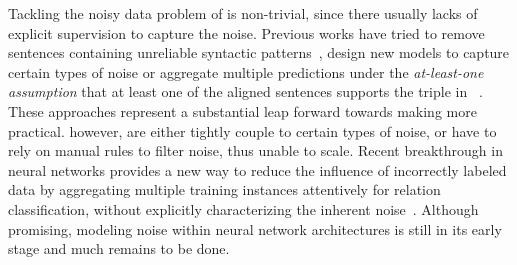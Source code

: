 Tackling the noisy data problem of \DS is non-trivial, since there usually lacks of explicit supervision to capture the noise.
Previous works have tried to remove sentences containing unreliable syntactic patterns~\cite{takamatsu2012reducing}, 
design new models to capture certain types of noise or aggregate multiple predictions under the
\textit{at-least-one assumption}
that at least one of the aligned sentences supports the triple in \KB~\cite{riedel2010modeling,surdeanu2012multi,ritter2013modeling,min2013distant}.
These approaches represent a substantial leap forward towards making \DS more practical. however,  are either tightly couple to certain types of noise,
or have to rely on manual rules to filter noise, thus unable to scale.
%
Recent breakthrough in neural networks provides a new way to reduce the influence of incorrectly labeled data by aggregating multiple training instances attentively for relation classification, without explicitly characterizing the inherent noise~\cite{lin2016neural,zeng2015distant}.
Although promising, %
 modeling noise within neural network architectures is still in its early stage and much remains to be done.


